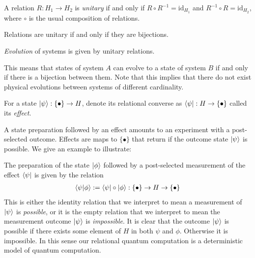 \begin{defn}
A relation $R:H_1\to H_2$ is \emph{unitary} if and only if $R\circ R^{-1} = \mbox{id}_{H_1}$ and $R^{-1}\circ R = \mbox{id}_{H_2}$, where $\circ$ is the usual composition of relations.
\end{defn}

\begin{corollary}
\label{cor:bijections}
Relations are unitary if and only if they are bijections.
\end{corollary}

\begin{axiom}
\emph{Evolution} of systems is given by unitary relations.
\end{axiom}

\noindent This means that states of system $A$ can evolve to a state of system $B$ if and only if there is a bijection between them. Note that this implies that there do not exist physical evolutions between systems of different cardinality. 

\begin{defn}
For a state $| \psi \rangle:\{\bullet\}\to H$, denote its relational converse as $\langle \psi |:H\to\{\bullet\}$ called its \emph{effect}.
\end{defn}

\noindent A state preparation followed by an effect amounts to an experiment with a post-selected outcome. Effects are maps to $\{\bullet\}$ that return if the outcome state $| \psi \rangle$ is possible.
 We give an example to illustrate:
\begin{example}
The preparation of the state $| \phi \rangle$ followed by a post-selected measurement of the effect $\langle \psi |$ is given by the relation
\begin{align*}
\langle\psi|\phi\rangle:=\langle \psi |\circ| \phi \rangle:\{\bullet\}\to H\to \{\bullet\}
\end{align*}
This is either the identity relation that we interpret to mean a measurement of $| \psi \rangle$ is \emph{possible}, or it is the empty relation that we interpret to mean the measurement outcome $| \psi \rangle$ is \emph{impossible}. It is clear that the outcome $| \psi \rangle$ is possible if there exists some element of $H$ in both $\psi$ and $\phi$. Otherwise it is impossible.
In this sense our relational quantum computation is a deterministic model of quantum computation.
\end{example}

